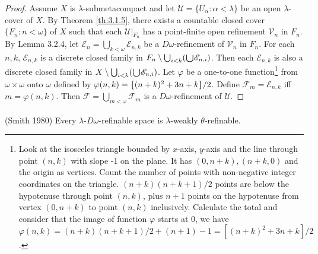 \documentclass[ch3.tex]{subfiles}
\begin{document}
\begin{proof}
Assume $X$ is $\lambda$-submetacompact and let 
$\mathscr{U} = \{ U_\alpha: \alpha < \lambda \}$ be an open $\lambda$-cover of $X$. 
By Theorem \ref{th:3.1.5}, 
there exists a countable closed cover $\{ F_n: n < \omega\}$ of $X$ such that each $\mathscr{U}\vert{}_{F_n}$ has a point-finite open refinement 
$\mathscr{V}_n$ in $F_n$. By Lemma 3.2.4, let 
$\mathscr{E}_n = \bigcup_{k<\omega} \mathscr{E}_{n,k}$ be a 
$D\omega$-refinement of $\mathscr{V}_n$ in $F_n$. For each $n, k$, 
$\mathscr{E}_{n,k}$ is a discrete closed family in 
$F_n \setminus\bigcup_{i<k}(\raisebox{-2pt}{\scalebox{1.5}{$\cup$}} \mathscr{E}_{n,i})$. Then each 
$\mathscr{E}_{n,k}$ is also a discrete closed family in 
$X \setminus \bigcup_{i<k}(\raisebox{-2pt}{\scalebox{1.5}{$\cup$}} \mathscr{E}_{n,i})$.
Let $\varphi$ be a one-to-one function\footnote{Look at the isosceles triangle bounded by $x$-axis, 
$y$-axis and the line through point $(n,k)$ with slope -1 on the plane. It has $(0, n+k), (n+k, 0)$ and 
the origin as vertices. Count the number of points with non-negative integer coordinates on the triangle. 
$(n+k)(n+k+1)/2$ points are below the hypotenuse through point $(n, k)$, plus $n+1$
points on the hypotenuse from vertex $(0, n+k)$ to point $(n,k)$ inclusively. Calculate the
total and consider that the image of function $\varphi$ starts at 0, we have
$\varphi(n,k) = (n+k)(n+k+1)/2 +(n+1) -1 =[(n+k)^2+3n+k]/2$.}
from $\omega \times \omega$ 
onto $\omega$ defined by $\varphi(n, k) =\hstretch{1.8}{[}(n+k)^2 + 3n + k\hstretch{1.8}{]}/2$. 
Define $\mathscr{F}_m = \mathscr{E}_{n,k}$ iff $m = \varphi(n, k)$. 
Then $\mathscr{F} = \bigcup_{m<\omega} \mathscr{F}_m$ is a 
$D\omega$-refinement of $\mathscr{U}$.
\end{proof}


{\theorem{}  \label{th:3.2.6}
\textup{(\hstretch{1.8}{[}Smith 1980\hstretch{1.8}{]}\textsuperscript{\cite{Smith1980}})} 
Every $\lambda$-$D\omega$-refinable space is 
$\lambda$-weakly $\bar{\theta}$-refinable.
}
\end{document}
